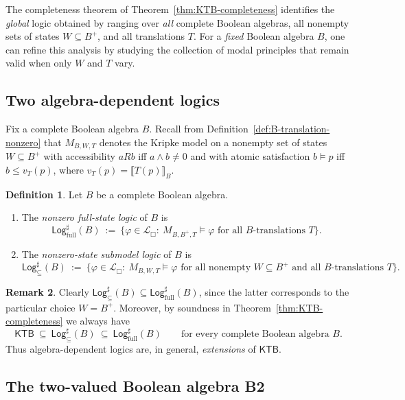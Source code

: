 \documentclass[11pt]{amsart}
\theoremstyle{definition}
\newtheorem{definition}{Definition}[section]
\newtheorem{remark}[definition]{Remark}
\theoremstyle{plain}
\newcommand{\Lbox}{\mathcal L_{\Box}} %
\newcommand{\val}[1]{\llbracket #1\rrbracket_B}
\newcommand{\KTB}{\mathsf{KTB}}
\newcommand{\Logfull}{\mathsf{Log}_{\mathrm{full}}^{\sharp}}
\newcommand{\Logsub}{\mathsf{Log}_{\subseteq}^{\sharp}}
\begin{document}
The completeness theorem of Theorem~\ref{thm:KTB-completeness} identifies the \emph{global} logic obtained
by ranging over \emph{all} complete Boolean algebras, all nonempty sets of states $W\subseteq B^+$, and all
translations $T$. For a \emph{fixed} Boolean algebra $B$, one can refine this analysis by studying the
collection of modal principles that remain valid when only $W$ and $T$ vary.

\subsection{Two algebra-dependent logics}

Fix a complete Boolean algebra $B$.
Recall from Definition~\ref{def:B-translation-nonzero} that $M_{B,W,T}$ denotes the Kripke model on a nonempty
set of states $W\subseteq B^+$ with accessibility $aRb$ iff $a\wedge b\neq 0$ and with atomic satisfaction
$b\models p$ iff $b\le v_T(p)$, where $v_T(p)=\val{T(p)}$.

\begin{definition}\label{def:logic-of-B}
Let $B$ be a complete Boolean algebra.
\begin{enumerate}[label=(\roman*)]
\item The \emph{nonzero full-state logic} of $B$ is
\[
\Logfull(B)\ :=\ \{\varphi\in\Lbox:\ M_{B,B^+,T}\models \varphi\text{ for all $B$-translations $T$}\}.
\]
\item The \emph{nonzero-state submodel logic} of $B$ is
\[
\Logsub(B)\ :=\ \{\varphi\in\Lbox:\ M_{B,W,T}\models \varphi\text{ for all nonempty $W\subseteq B^+$ and all $B$-translations $T$}\}.
\]
\end{enumerate}
\end{definition}

\begin{remark}\label{rem:logic-of-B-basic}
Clearly $\Logsub(B)\subseteq \Logfull(B)$, since the latter corresponds
to the particular choice $W=B^+$. Moreover, by soundness in Theorem~\ref{thm:KTB-completeness} we always have
\[
\KTB \ \subseteq\ \Logsub(B)\ \subseteq\ \Logfull(B)
\qquad\text{for every complete Boolean algebra $B$.}
\]
Thus algebra-dependent logics are, in general, \emph{extensions} of $\KTB$.
\end{remark}

\subsection{The two-valued Boolean algebra B2}
\end{document}
